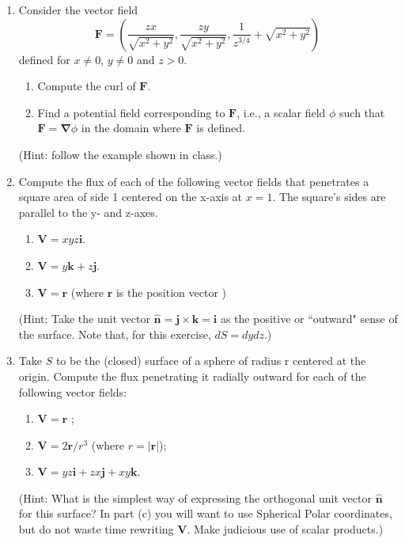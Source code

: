 \documentclass[fleqn]{article}
\begin{document}
  \begin{enumerate}
    \item Consider the vector field 
      $$
      \mathbf{F}= \left(\frac{zx}{\sqrt{x^2 + y^2} }  , \frac{zy}{\sqrt{x^2 + y^2}}, \frac{1}{z^{3/4}} + \sqrt{x^2 + y^2} \right)~
      $$
      defined for $x\neq 0$, $y\neq 0$ and $z>0$. 
      \begin{enumerate}
        \item Compute the curl of $\mathbf{F}$.
        \item Find a potential field corresponding to $\mathbf{F}$, i.e., a scalar field $\phi$ such that $\mathbf{F}=\mathbf{\nabla}\phi$ in the domain where $\mathbf{F}$ is defined. 
      \end{enumerate}
      (Hint: follow the example shown in class.)


    \item Compute the flux of each of the following vector fields that penetrates a square area
    of side 1 centered on the x-axis at $x=1$. The square's sides are parallel to the y- and z-axes.
      \begin{enumerate}
        \item $\mathbf{V}=xyz\mathbf{i}$.
        \item $\mathbf{V}=y\mathbf{k}+z\mathbf{j}$.
        \item $\mathbf{V}=\mathbf{r}$ (where $\mathbf{r}$ is the position vector )
      \end{enumerate}
      (Hint: Take the unit vector $\mathbf{\hat n}=\mathbf{j} \times \mathbf{k} = \mathbf{i}$ as the positive or ``outward" sense of the surface. Note that, for this exercise, $dS=dy dz$.)


    \item Take $S$ to be the (closed) surface of a sphere of radius r centered at the origin. Compute the flux penetrating it radially outward for each of the following vector fields:
      \begin{enumerate}
        \item $\mathbf{V}=\mathbf{r}$ ;
        \item $\mathbf{V}=2 \mathbf{r}/r^3$ (where $r=|\mathbf{r}|$); 
        \item $\mathbf{V}=yz\mathbf{i}+zx\mathbf{j}+xy\mathbf{k}$.
      \end{enumerate}
      (Hint: What is the simplest way of expressing the orthogonal unit vector $\mathbf{\hat n}$ for this surface? In part (c) you will want to use Spherical Polar coordinates, but do not waste time rewriting $\mathbf{V}$. Make judicious use of scalar products.)

  \end{enumerate}
\end{document}
